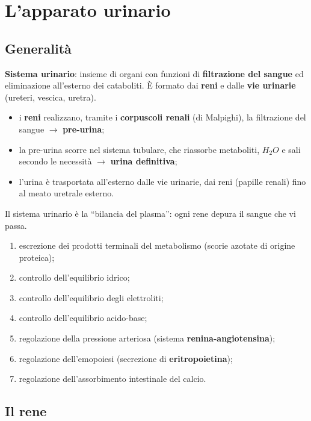 \chapter{L'apparato urinario}

\section{Generalità}

\textbf{Sistema urinario}: insieme di organi con funzioni di \textbf{filtrazione del sangue} ed
eliminazione all'esterno dei cataboliti. È formato dai \textbf{reni} e dalle \textbf{vie urinarie}
(ureteri, vescica, uretra).
\begin{itemize}
  \item i \textbf{reni} realizzano, tramite i \textbf{corpuscoli renali} (di Malpighi), la
    filtrazione del sangue $\rightarrow$ \textbf{pre-urina};
  \item la pre-urina scorre nel sistema tubulare, che riassorbe metaboliti, $H_2O$ e sali secondo le
    necessità $\rightarrow$ \textbf{urina definitiva};
  \item l'urina è trasportata all'esterno dalle vie urinarie, dai reni (papille renali) fino al meato
    uretrale esterno.
\end{itemize}
Il sistema urinario è la ``bilancia del plasma'': ogni rene depura il sangue che vi passa.

\begin{enumerate}
  \item escrezione dei prodotti terminali del metabolismo (scorie azotate di origine proteica);
  \item controllo dell'equilibrio idrico;
  \item controllo dell'equilibrio degli elettroliti;
  \item controllo dell'equilibrio acido-base;
  \item regolazione della pressione arteriosa (sistema \textbf{renina-angiotensina});
  \item regolazione dell'emopoiesi (secrezione di \textbf{eritropoietina});
  \item regolazione dell'assorbimento intestinale del calcio.
\end{enumerate}

\section{Il rene}

